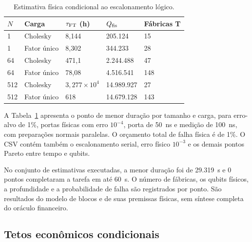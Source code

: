 \documentclass[conference,a4paper]{IEEEtran}
\begin{document}
\begin{table}[!tb]
\caption{Estimativa física condicional ao escalonamento lógico.}\label{tab:8}
\centering\footnotesize\setlength{\tabcolsep}{4pt}
\renewcommand{\arraystretch}{1.12}
\begin{tabular}{@{}lllll@{}}
\toprule

\(N\) & Carga & \(\tau_{\rm FT}\) (h) & \(Q_{\rm fis}\) & Fábricas T \\
\midrule\noalign{}

1 & Cholesky & 8,144 & 205.124 & 15 \\
1 & Fator único & 8,302 & 344.233 & 28 \\
64 & Cholesky & 471,1 & 2.244.488 & 47 \\
64 & Fator único & 78,08 & 4.516.541 & 148 \\
512 & Cholesky & \(3{,}277\times10^{4}\) & 14.989.927 & 27 \\
512 & Fator único & 618 & 14.679.128 & 143 \\
\bottomrule
\end{tabular}
\end{table}

A Tabela~\ref{tab:8} apresenta o ponto de menor duração por tamanho e carga, para erro-alvo de 1\%, portas físicas com erro \(10^{-4}\), porta de 50~ns e medição de 100~ns, com preparações normais paralelas. O orçamento total de falha física é de 1\%. O CSV contém também o escalonamento serial, erro físico \(10^{-3}\) e os demais pontos Pareto entre tempo e qubits.

No conjunto de estimativas executadas, a menor duração foi de 29.319~s e 0 pontos completaram a tarefa em até 60~s. O número de fábricas, os qubits físicos, a profundidade e a probabilidade de falha são registrados por ponto. São resultados do modelo de blocos e de suas premissas físicas, sem síntese completa do oráculo financeiro.

\subsection{Tetos econômicos condicionais}\label{tetos-econuxf4micos-condicionais}
\end{document}
